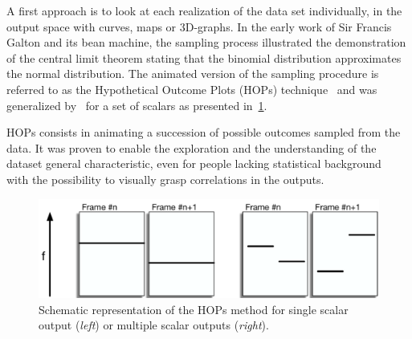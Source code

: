 A first approach is to look at each realization of the data set individually, in the output space with curves, maps or 3D-graphs. In the early work of Sir Francis Galton and its bean machine, the sampling process illustrated the demonstration of the central limit theorem stating that the binomial distribution approximates the normal distribution. The animated version of the sampling procedure is referred to as the Hypothetical Outcome Plots (HOPs) technique~\citep{Ehlschlaeger1997} and was generalized by~\citep{Hullman2015} for a set of scalars as presented in~\cref{fig:pattern_hop}.

HOPs consists in animating a succession of possible outcomes sampled from the data. It was proven to enable the exploration and the understanding of the dataset general characteristic, even for people lacking statistical background~\citep{Belia2005} with the possibility to visually grasp correlations in the outputs. 

\begin{figure}[!ht]
\centering
\includegraphics[width=0.9\linewidth,keepaspectratio]{fig/literature/pattern_hop.pdf}
\caption{Schematic representation of the HOPs method for single scalar output (\emph{left}) or multiple scalar outputs (\emph{right}).}
\label{fig:pattern_hop}
\end{figure}


